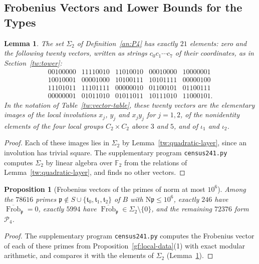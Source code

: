 \documentclass[11pt]{amsart}
\numberwithin{equation}{section}
\newtheorem{proposition}[equation]{Proposition}
\newtheorem{lemma}[equation]{Lemma}
\theoremstyle{definition}
\theoremstyle{remark}
\DeclareMathOperator{\Frob}{Frob}
\newcommand{\Ftwo}{\mathbb F_2}
\begin{document}
\subsection{Frobenius Vectors and Lower Bounds for the Types}
\label{an:census}

\begin{lemma}\label{an:sigma2}
The set $\Sigma_2$ of Definition~\ref{an:P4} has exactly $21$ elements: zero
and the following twenty vectors, written as strings $c_0c_1\cdots c_7$ of
their coordinates, as in Section~\ref{tw:tower}:
\[
\begin{array}{ccccc}
 00100000&11110010&11010010&00010000&10000001\\
 10010001&00001000&10100111&10101111&00000100\\
 11101011&11101111&00000010&01100101&01100111\\
 00000001&01011010&01011011&10111010&11000101.
\end{array}
\]
In the notation of Table~\ref{tw:vector-table}, these twenty vectors are the
elementary images of the local involutions $x_j$, $y_j$ and $x_jy_j$ for
$j=1,2$, of the nonidentity elements of the four local groups
$C_2\times C_2$ above $3$ and $5$, and of $\iota_1$ and $\iota_2$.
\end{lemma}

\begin{proof}
Each of these images lies in $\Sigma_2$ by Lemma~\ref{tw:quadratic-layer},
since an involution has trivial square. The supplementary program
\texttt{census241.py} computes $\Sigma_2$ by linear algebra over $\Ftwo$
from the relations of Lemma~\ref{tw:quadratic-layer}, and finds no other
vectors.
\end{proof}

\begin{proposition}[Frobenius vectors of the primes of norm at most $10^6$]\label{an:census-prop}
Among the $78616$ primes
$\mathfrak p\notin S\cup\{\mathfrak t_0,\mathfrak t_1,\mathfrak t_2\}$ of
$B$ with $\mathrm N\mathfrak p\le10^6$, exactly $246$ have
$\overline{\Frob}_{\mathfrak p}=0$, exactly $5994$ have
$\overline{\Frob}_{\mathfrak p}\in\Sigma_2\setminus\{0\}$, and the remaining $72376$ form
$\mathcal P_4$.
\end{proposition}

\begin{proof}
The supplementary program \texttt{census241.py} computes the Frobenius
vector of each of these primes from Proposition~\ref{gf:local-data}(1) with
exact modular arithmetic, and compares it with the elements of $\Sigma_2$
(Lemma~\ref{an:sigma2}).
\end{proof}
\end{document}
